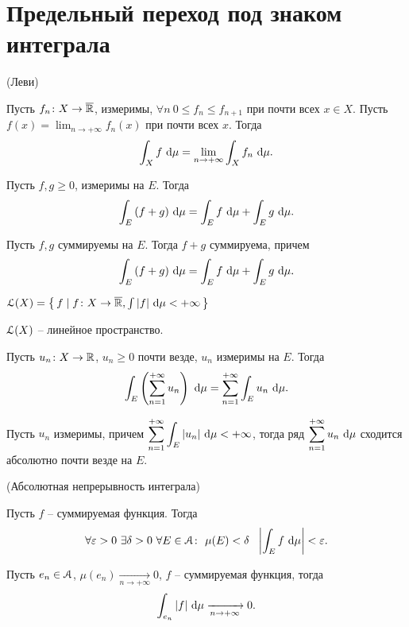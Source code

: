 \section{Предельный переход под знаком интеграла}

\begin{theorem}(Леви)

    Пусть $f_n \colon X \to \overline{\mathbb{R}}$, измеримы, $\forall n~ 0 \leqslant f_n \leqslant f_{n + 1}$
    при почти всех $x \in X$. Пусть $\displaystyle f(x) = \lim_{n \to +\infty}{f_n(x)}$ 
    при почти всех $x$. Тогда
\[
    \int_X{f ~\mathrm{d}\mu} = \lim_{n \to +\infty}{\int_X{f_n ~\mathrm{d}\mu}}
.\] 
\end{theorem}

\begin{theorem}

    Пусть $f, g \geqslant 0$, измеримы на $E$. Тогда
\[
    \int_E{(f + g) ~\mathrm{d}\mu} = \int_E{f ~\mathrm{d}\mu} + \int_E{g ~\mathrm{d}\mu}
.\] 
\end{theorem}

\begin{corollary}
    
    Пусть $f, g$ суммируемы на $E$. Тогда $f + g$ суммируема, причем
\[
    \int_E{(f + g) ~\mathrm{d}\mu} = \int_E{f ~\mathrm{d}\mu} + \int_E{g ~\mathrm{d}\mu}
.\]
\end{corollary}

\begin{definition}
    $\mathcal{L}(X) = \left\{\, f \mid f \colon X \to \overline{\mathbb{R}}, \int{|f| ~\mathrm{d}\mu} < +\infty \,\right\}$
\end{definition}

\begin{lemma}
    $\mathcal{L}(X)$ -- линейное пространство. 
\end{lemma}

\begin{theorem}
    Пусть $u_n \colon X \to \mathbb{R}$, $u_n \geqslant 0$ почти везде, $u_n$ измеримы на $E$.
    Тогда
\[
    \int_E{\left(\sum_{n = 1}^{+\infty}{u_n}\right) ~\mathrm{d}\mu} = \sum_{n = 1}^{+\infty}{\int_E{u_n ~\mathrm{d}\mu}}
.\]
\end{theorem}

\begin{corollary}
    Пусть $u_n$ измеримы, причем $\displaystyle \sum_{n = 1}^{+\infty}{\int_E{|u_n| ~\mathrm{d}\mu}} < +\infty$,
    тогда ряд $\displaystyle \sum_{n = 1}^{+\infty}{u_n ~\mathrm{d}\mu}$ сходится абсолютно почти везде на $E$.
\end{corollary}

\begin{theorem}(Абсолютная непрерывность интеграла)

    Пусть $f$ -- суммируемая функция. Тогда
\[
    \forall \varepsilon > 0~ \exists \delta > 0~ \forall E \in \mathcal{A}\colon~ \mu(E) < \delta
    ~~ \left|\int_E{f ~\mathrm{d}\mu}\right| < \varepsilon
.\] 
\end{theorem}

\begin{corollary}
    Пусть $e_n \in \mathcal{A}$, $\mu(e_n) \xrightarrow[n \to +\infty]{} 0$, $f$ -- суммируемая функция,
    тогда
\[
    \int_{e_n}{|f| ~\mathrm{d}\mu} \xrightarrow[n \to +\infty]{} 0
.\] 
\end{corollary}

